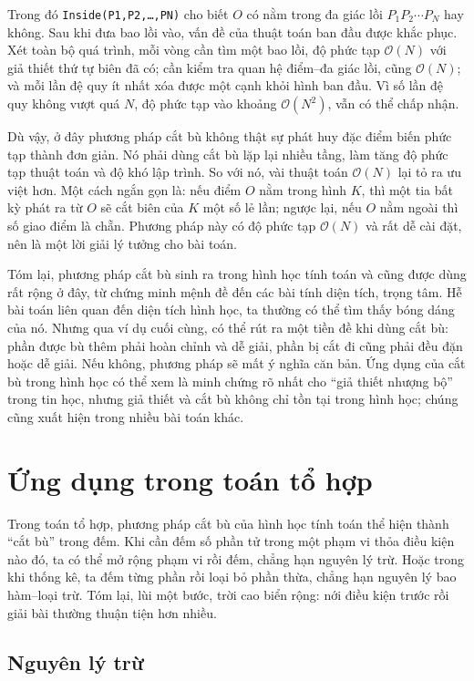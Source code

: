 \documentclass[11pt]{article}
\newcommand{\Oh}{\mathcal{O}}
\begin{document}
Trong đó \texttt{Inside(P1,P2,\ldots,PN)} cho biết $O$ có nằm trong đa giác
lồi $P_1P_2\cdots P_N$ hay không. Sau khi đưa bao lồi vào, vấn đề của thuật
toán ban đầu được khắc phục. Xét toàn bộ quá trình, mỗi vòng cần tìm một bao
lồi, độ phức tạp $\Oh(N)$ với giả thiết thứ tự biên đã có; cần kiểm tra quan
hệ điểm--đa giác lồi, cũng $\Oh(N)$; và mỗi lần đệ quy ít nhất xóa được một
cạnh khỏi hình ban đầu. Vì số lần đệ quy không vượt quá $N$, độ phức tạp vào
khoảng $\Oh(N^2)$, vẫn có thể chấp nhận.

Dù vậy, ở đây phương pháp cắt bù không thật sự phát huy đặc điểm biến phức
tạp thành đơn giản. Nó phải dùng cắt bù lặp lại nhiều tầng, làm tăng độ phức
tạp thuật toán và độ khó lập trình. So với nó, vài thuật toán $\Oh(N)$ lại
tỏ ra ưu việt hơn. Một cách ngắn gọn là: nếu điểm $O$ nằm trong hình $K$, thì
một tia bất kỳ phát ra từ $O$ sẽ cắt biên của $K$ một số lẻ lần; ngược lại,
nếu $O$ nằm ngoài thì số giao điểm là chẵn. Phương pháp này có độ phức tạp
$\Oh(N)$ và rất dễ cài đặt, nên là một lời giải lý tưởng cho bài toán.

Tóm lại, phương pháp cắt bù sinh ra trong hình học tính toán và cũng được dùng
rất rộng ở đây, từ chứng minh mệnh đề đến các bài tính diện tích, trọng tâm.
Hễ bài toán liên quan đến diện tích hình học, ta thường có thể tìm thấy bóng
dáng của nó. Nhưng qua ví dụ cuối cùng, có thể rút ra một tiền đề khi dùng cắt
bù: phần được bù thêm phải hoàn chỉnh và dễ giải, phần bị cắt đi cũng phải đều
đặn hoặc dễ giải. Nếu không, phương pháp sẽ mất ý nghĩa căn bản. Ứng dụng của
cắt bù trong hình học có thể xem là minh chứng rõ nhất cho ``giả thiết nhượng
bộ'' trong tin học, nhưng giả thiết và cắt bù không chỉ tồn tại trong hình học;
chúng cũng xuất hiện trong nhiều bài toán khác.

\section{Ứng dụng trong toán tổ hợp}

Trong toán tổ hợp, phương pháp cắt bù của hình học tính toán thể hiện thành
``cắt bù'' trong đếm. Khi cần đếm số phần tử trong một phạm vi thỏa điều kiện
nào đó, ta có thể mở rộng phạm vi rồi đếm, chẳng hạn nguyên lý trừ. Hoặc trong
khi thống kê, ta đếm từng phần rồi loại bỏ phần thừa, chẳng hạn nguyên lý bao
hàm--loại trừ. Tóm lại, lùi một bước, trời cao biển rộng: nới điều kiện trước
rồi giải bài thường thuận tiện hơn nhiều.

\subsection{Nguyên lý trừ}
\end{document}
